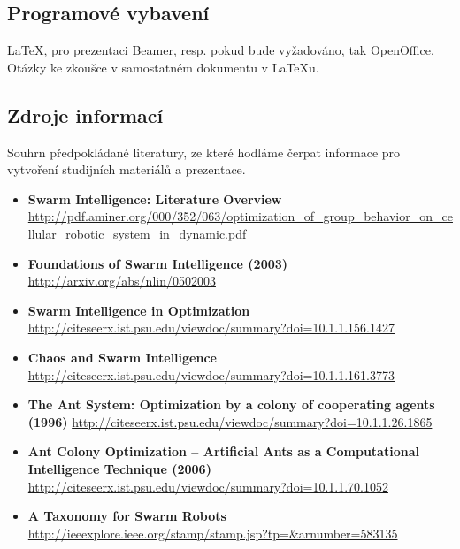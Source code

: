 \documentclass[a4paper,12pt]{article}
\begin{document}
\subsection*{Programové vybavení}
\LaTeX{}, pro prezentaci Beamer, resp. pokud bude vyžadováno, tak OpenOffice. Otázky ke zkoušce v samostatném dokumentu v \LaTeX{}u.


\subsection*{Zdroje informací}
Souhrn předpokládané literatury, ze které hodláme čerpat informace pro vytvoření studijních materiálů a prezentace.
\begin{itemize}
  \item {\bf Swarm Intelligence: Literature Overview} 
        \url{http://pdf.aminer.org/000/352/063/optimization\_of\_group\_behavior\_on\_cellular\_robotic\_system\_in\_dynamic.pdf}
  \item {\bf Foundations of Swarm Intelligence (2003)}
        \url{http://arxiv.org/abs/nlin/0502003} 
  \item {\bf Swarm Intelligence in Optimization}
        \url{http://citeseerx.ist.psu.edu/viewdoc/summary?doi=10.1.1.156.1427}
  \item {\bf Chaos and Swarm Intelligence}
        \url{http://citeseerx.ist.psu.edu/viewdoc/summary?doi=10.1.1.161.3773}
  \item {\bf The Ant System: Optimization by a colony of cooperating agents (1996)}
        \url{http://citeseerx.ist.psu.edu/viewdoc/summary?doi=10.1.1.26.1865}
  \item {\bf Ant Colony Optimization – Artificial Ants as a Computational Intelligence Technique (2006)}
        \url{http://citeseerx.ist.psu.edu/viewdoc/summary?doi=10.1.1.70.1052}
  \item {\bf A Taxonomy for Swarm Robots}
        \url{http://ieeexplore.ieee.org/stamp/stamp.jsp?tp=&arnumber=583135}
\end{itemize}
\end{document}
